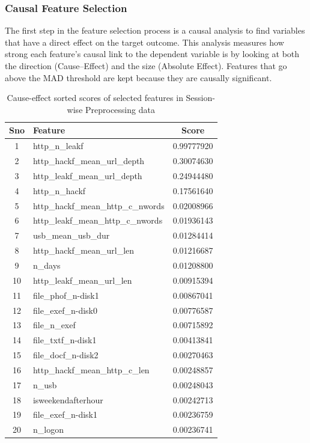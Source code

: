 \subsubsection{Causal Feature Selection}

The first step in the feature selection process is a causal analysis to find variables that have a direct effect on the target outcome.  This analysis measures how strong each feature's causal link to the dependent variable is by looking at both the direction (Cause–Effect) and the size (Absolute Effect).  Features that go above the MAD threshold are kept because they are causally significant.
\begin{table}[!ht]
\centering
\caption{Cause-effect sorted scores of selected features in Session-wise Preprocessing data}
\label{table4c}
\begin{tabular}{clc}
\toprule
\textbf{Sno} & \textbf{Feature} & \textbf{Score} \\
\midrule
1 & http\_n\_leakf & 0.99777920 \\
2 & http\_hackf\_mean\_url\_depth & 0.30074630 \\
3 & http\_leakf\_mean\_url\_depth & 0.24944480 \\
4 & http\_n\_hackf & 0.17561640 \\
5 & http\_hackf\_mean\_http\_c\_nwords & 0.02008966 \\
6 & http\_leakf\_mean\_http\_c\_nwords & 0.01936143 \\
7 & usb\_mean\_usb\_dur & 0.01284414 \\
8 & http\_hackf\_mean\_url\_len & 0.01216687 \\
9 & n\_days & 0.01208800 \\
10 & http\_leakf\_mean\_url\_len & 0.00915394 \\
11 & file\_phof\_n-disk1 & 0.00867041 \\
12 & file\_exef\_n-disk0 & 0.00776587 \\
13 & file\_n\_exef & 0.00715892 \\
14 & file\_txtf\_n-disk1 & 0.00413841 \\
15 & file\_docf\_n-disk2 & 0.00270463 \\
16 & http\_hackf\_mean\_http\_c\_len & 0.00248857 \\
17 & n\_usb & 0.00248043 \\
18 & isweekendafterhour & 0.00242713 \\
19 & file\_exef\_n-disk1 & 0.00236759 \\
20 & n\_logon & 0.00236741 \\

\end{tabular}
\end{table}
